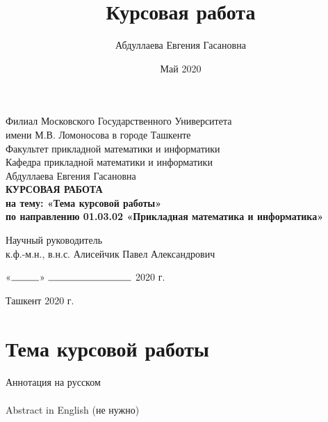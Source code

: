 \documentclass[12pt, a4paper, oneside]{article}
\title{Курсовая работа}
\author{Абдуллаева Евгения Гасановна}
\date{Май 2020}
\begin{document}
    \begin{titlepage}
        \begin{center}
            Филиал Московского Государственного Университета\\
            имени М.В. Ломоносова в городе Ташкенте\\
            \vspace{0.5cm}
            Факультет прикладной математики и информатики\\
            \vspace{0.5cm}
            Кафедра прикладной математики и информатики\\
            \vfill
            Абдуллаева Евгения Гасановна\\
            \vfill
            \textbf{\MakeUppercase{Курсовая работа}\\
            на тему: «Тема курсовой работы»\\
            \vspace{0.5cm}
            по направлению 01.03.02 «Прикладная математика и информатика»}
        \end{center}
        \vfill
        \begin{flushleft}
            Научный руководитель\\
            к.ф.-м.н., в.н.с. Алисейчик Павел Александрович
        \end{flushleft}
        \vspace{0.5cm}
        \begin{flushright}
            «$\rule{1cm}{0.15mm}$» $\rule{3cm}{0.15mm}$ 2020 г.
        \end{flushright}
        \vfill
        \begin{center}
            Ташкент 2020 г.
        \end{center}
    \end{titlepage}
    
    \section*{Тема курсовой работы}
        \paragraph{}
        Аннотация на русском
        \paragraph{}
        Abstract in English (не нужно)
    \setcounter{page}{2}
    \newpage
    
\end{document}
